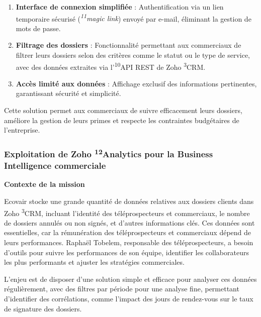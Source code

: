\begin{enumerate}
    \item \textbf{Interface de connexion simplifiée} : Authentification via un lien temporaire sécurisé (\textit{\textsuperscript{11}magic link}) envoyé par e-mail, éliminant la gestion de mots de passe.\vspace{0.3cm}
    \item \textbf{Filtrage des dossiers} : Fonctionnalité permettant aux commerciaux de filtrer leurs dossiers selon des critères comme le statut ou le type de service, avec des données extraites via l’\textsuperscript{10}API REST de Zoho \textsuperscript{3}CRM.\vspace{0.3cm}
    \item \textbf{Accès limité aux données} : Affichage exclusif des informations pertinentes, garantissant sécurité et simplicité.\vspace{0.3cm}
\end{enumerate}

Cette solution permet aux commerciaux de suivre efficacement leurs dossiers, améliore la gestion de leurs primes et respecte les contraintes budgétaires de l’entreprise.


\subsubsection{Exploitation de Zoho \textsuperscript{12}Analytics pour la Business Intelligence commerciale}

\textbf{Contexte de la mission}\vspace{0.3cm}

Ecovair stocke une grande quantité de données relatives aux dossiers clients dans Zoho \textsuperscript{3}CRM, incluant l’identité des téléprospecteurs et commerciaux, le nombre de dossiers annulés ou non signés, et d’autres informations clés. Ces données sont essentielles, car la rémunération des téléprospecteurs et commerciaux dépend de leurs performances. Raphaël Tobelem, responsable des téléprospecteurs, a besoin d’outils pour suivre les performances de son équipe, identifier les collaborateurs les plus performants et ajuster les stratégies commerciales.

L’enjeu est de disposer d’une solution simple et efficace pour analyser ces données régulièrement, avec des filtres par période pour une analyse fine, permettant d’identifier des corrélations, comme l’impact des jours de rendez-vous sur le taux de signature des dossiers.\vspace{0.3cm}

